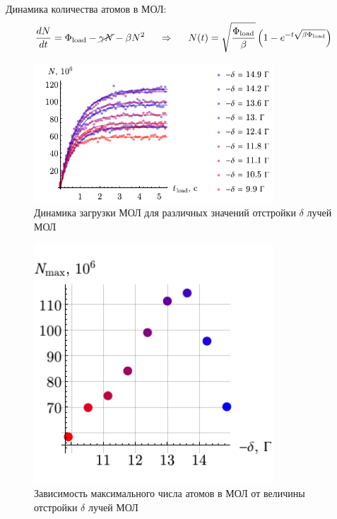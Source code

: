 Динамика количества атомов в МОЛ:
\begin{equation*}
	\frac{d N}{d t} = \Phi_{\textnormal{load}} - \cancel{\gamma N} - \beta N^2
	\hspace{0.5cm} \Rightarrow \hspace{0.5cm}
	N(t) = \sqrt{\frac{\Phi_{\textnormal{load}}}{\beta}} \left(1-e^{-t \sqrt{\beta \Phi_{\textnormal{load}}}}\right)
\end{equation*}




\begin{minipage}{0.6\textwidth}


\begin{figure}[h]
    \centering
    \includegraphics[width=0.8\textwidth]{../MOT/figs/motload_v2.pdf}
    \caption{Динамика загрузки МОЛ для различных значений отстройки $\delta$ лучей МОЛ}
\end{figure}

\end{minipage}
\hfill
\begin{minipage}{0.35\textwidth}

\begin{figure}[h]
    \centering
    \includegraphics[width=0.8\textwidth]{../MOT/figs/motload2_v2.pdf}
    \caption{Зависимость максимального числа атомов в МОЛ от величины отстройки $\delta$ лучей МОЛ}
\end{figure}

\end{minipage}